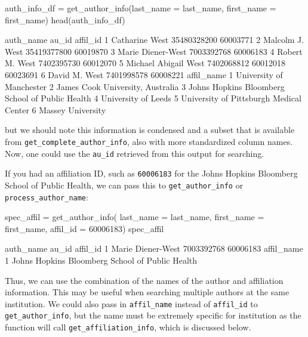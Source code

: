 \begin{Schunk}
\begin{Sinput}
auth_info_df = get_author_info(last_name = last_name, 
                              first_name = first_name)
head(auth_info_df)
\end{Sinput}
\begin{Soutput}
             auth_name       au_id          affil_id
1       Catharine West 35480328200          60003771
2      Malcolm J. West 35419377800          60019870
3    Marie Diener-West  7003392768          60006183
4       Robert M. West  7402395730          60012070
5 Michael Abigail West  7402068812 60012018 60023691
6        David M. West  7401998578          60008221
                                       affil_name
1                        University of Manchester
2                James Cook University, Australia
3 Johns Hopkins Bloomberg School of Public Health
4                             University of Leeds
5         University of Pittsburgh Medical Center
6                               Massey University
\end{Soutput}
\end{Schunk}

but we should note this information is condensed and a subset that is
available from \texttt{get\_complete\_author\_info}, also with more
standardized column names. Now, one could use the \texttt{au\_id}
retrieved from this output for searching.

If you had an affiliation ID, such as \texttt{60006183} for the Johns
Hopkins Bloomberg School of Public Health, we can pass this to
\texttt{get\_author\_info} or \texttt{process\_author\_name}:

\begin{Schunk}
\begin{Sinput}
spec_affil = get_author_info(
  last_name = last_name, 
  first_name = first_name,
  affil_id = 60006183)
spec_affil
\end{Sinput}
\begin{Soutput}
          auth_name      au_id affil_id
1 Marie Diener-West 7003392768 60006183
                                       affil_name
1 Johns Hopkins Bloomberg School of Public Health
\end{Soutput}
\end{Schunk}

Thus, we can use the combination of the names of the author and
affiliation information. This may be useful when searching multiple
authors at the same institution. We could also pass in
\texttt{affil\_name} instead of \texttt{affil\_id} to
\texttt{get\_author\_info}, but the name must be extremely specific for
institution as the function will call \texttt{get\_affiliation\_info},
which is discussed below.

